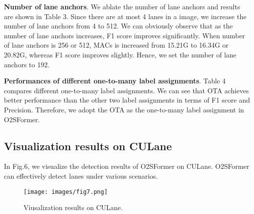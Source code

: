 \documentclass{bmvc2k}
\begin{document}
 {\bf Number of lane anchors}. We ablate the number of lane anchors and results are shown in Table 3. Since there are at most 4 lanes in a image, 
 we increase the number of lane anchors from 4 to 512. We can obviously observe that as the number of lane anchors increases, 
 F1 score improves significantly. When number of lane anchors is 256 or 512, MACs is increased from 15.21G to 
 16.34G or 20.82G, whereas F1 score improves slightly. Hence, we set the number of lane anchors to 192.

 \begin{table}[!h]
   \centering
   \caption{Performances of different one-to-many label assignments.}
   \tabcolsep=0.5cm
   \small
 \end{table}
 {\bf Performances of different one-to-many label assignments}. Table 4 compares different one-to-many label assignments. We can see that OTA achieves better performance 
 than the other two label assignments in terms of F1 score and Precision. 
 Therefore, we adopt the OTA as the one-to-many label assignment in O2SFormer.

\subsection{Visualization results on CULane}
In Fig.6, we visualize the detection results of O2SFormer on CULane. 
O2SFormer can effectively detect lanes under various scenarios.
\begin{figure*}[!h]
   \begin{center}
   \texttt{[image: images/fig7.png]}
   \vspace{-0.5cm} 
   \end{center}
      \caption{Viusalization results on CULane.}
      \vspace{-0.1cm}
   \label{fig:short}
   \end{figure*}
\end{document}
